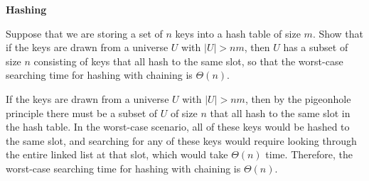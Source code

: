 \question \textbf{Hashing}

Suppose that we are storing a set of $n$ keys into a hash table of size $m$. Show that if the keys are drawn from a universe $U$ with $\lvert U \rvert > nm$, then $U$ has a subset of size $n$ consisting of keys that all hash to the same slot, so that the worst-case searching time for hashing with chaining is $\Theta(n)$.

\begin{solution}
If the keys are drawn from a universe $U$ with $\lvert U \rvert > nm$, then by the pigeonhole principle there must be a subset of $U$ of size $n$ that all hash to the same slot in the hash table. In the worst-case scenario, all of these keys would be hashed to the same slot, and searching for any of these keys would require looking through the entire linked list at that slot, which would take $\Theta(n)$ time. Therefore, the worst-case searching time for hashing with chaining is $\Theta(n)$.
\end{solution}
